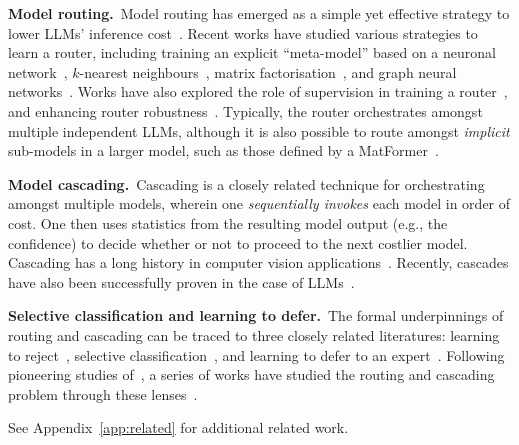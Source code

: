 \textbf{Model routing.}\
Model routing has emerged as a simple yet effective strategy to lower LLMs' inference cost~\citep{Hendy:2023,Narayanan:2023}.
Recent works have studied various strategies to learn a %
router,
including
training an explicit ``meta-model'' based on a neuronal network~\citep{Ding:2024,Sakota:2024,CheJiaLin2024,Aggarwal:2024},
$k$-nearest neighbours~\citep{HuBieLi2024,Shnitzer:2023,Stripelis:2024,Lee:2024},
matrix factorisation~\citep{OngAlmWu2024,ZhuWuWen2024,Li:2025},
and graph neural networks~\citep{Feng:2024}.
Works have also explored the role of supervision in training a router~\citep{LuYuaLin2024,Zhao:2024},
and enhancing router robustness~\citep{Dann:2024,Montreuil:2025,Shafran:2025}.
Typically,
the router orchestrates amongst multiple independent LLMs,
although it is also possible to route amongst \emph{implicit} sub-models in a larger model, such as those defined by a MatFormer~\citep{Devvrit:2024,Cai:2024}.


\textbf{Model cascading.}\
Cascading is a closely related technique for orchestrating amongst multiple models,
wherein one \emph{sequentially invokes} {each} model in order of cost.
One then uses statistics from the resulting model output (e.g., the confidence) to decide whether or not to proceed to the next costlier model.
Cascading has a long history in computer vision applications~\citep{VioJon2001,WanLuoCra2018,Swayamdipta:2018,Rawat:2021,WanKonChr2022,Kag:2023,Jitkrittum:2023}.
Recently, cascades have also been successfully proven in the case of LLMs~\citep{CheZahZou2023,GupNarJit2024,Yue:2024,Chen:2024}.

\textbf{Selective classification and learning to defer.}\ 
The formal underpinnings of routing and cascading can be traced to
three closely related literatures:
learning to reject~\citep{chow1970optimum,Bartlett:2008,Cortes:2016}, 
selective classification~\citep{Geifman:2019,NarMenJit2024,NarMenJit2024a},
and learning to defer to an expert~\citep{Madras:2018,SanErdKon2023}.
Following pioneering studies of~\citet{Trapeznikov:2013,Bolukbasi:2017,MozSon2020},
a series of works have studied the routing and cascading problem through these lenses~\citep{NarJitMen2022,MaoMohMoh2024,Mao2024,MaoMohZho2024,MaoMohZho2024a}.

\ifarxiv

\else
See Appendix~\ref{app:related} for additional related work.
\fi
